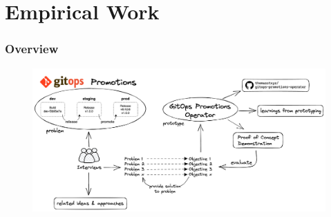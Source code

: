 \documentclass{beamer}
\begin{document}
\section{Empirical Work}

\begin{frame}
\frametitle{Overview}

\begin{figure}[h]
	\centering
	\includegraphics[width=1.0\linewidth]{assets/overview-empirical-work.png}
	\label{fig:overview-empirical-work}	
\end{figure}

\end{frame}


\end{document}

